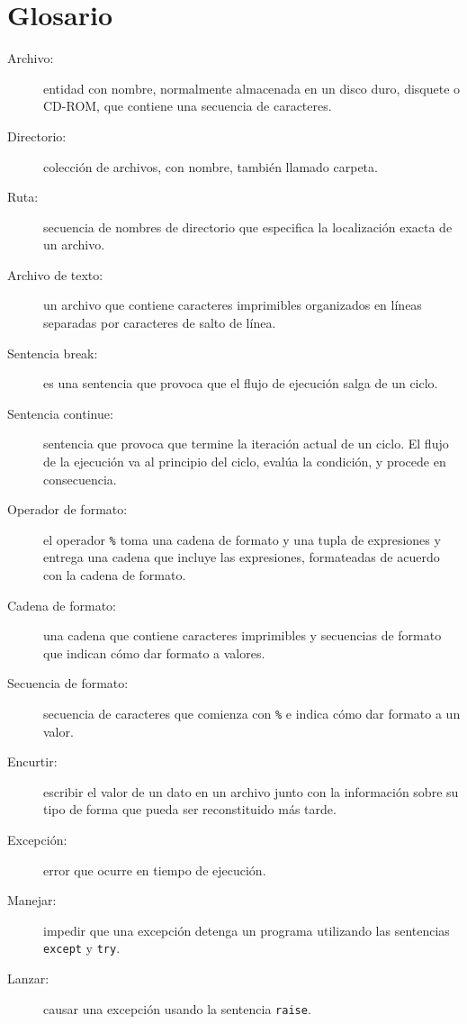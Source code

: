 \section{Glosario}

  
  
  
   
  
\begin{description}
\item [{Archivo:}] entidad con nombre, normalmente almacenada en un disco
duro, disquete o CD-ROM, que contiene una secuencia de caracteres.
\item [{Directorio:}] colección de archivos, con nombre, también llamado
carpeta.
\item [{Ruta:}] secuencia de nombres de directorio que especifica la localización
exacta de un archivo.
\item [{Archivo de texto:}] un archivo que contiene caracteres imprimibles
organizados en líneas separadas por caracteres de salto de línea.
\item [{Sentencia break:}] es una sentencia que provoca que el flujo de
ejecución salga de un ciclo.
\item [{Sentencia continue:}] sentencia que provoca que termine la iteración
actual de un ciclo. El flujo de la ejecución va al principio del ciclo,
evalúa la condición, y procede en consecuencia.
\item [{Operador de formato:}] el operador \texttt{\%} toma una cadena
de formato y una tupla de expresiones y entrega una cadena que incluye
las expresiones, formateadas de acuerdo con la cadena de formato.
\item [{Cadena de formato:}] una cadena que contiene caracteres imprimibles
y secuencias de formato que indican cómo dar formato a valores.
\item [{Secuencia de formato:}] secuencia de caracteres que comienza con
\texttt{\%} e indica cómo dar formato a un valor.
\item [{Encurtir:}] escribir el valor de un dato en un archivo junto con
la información sobre su tipo de forma que pueda ser reconstituido
más tarde.
\item [{Excepción:}] error que ocurre en tiempo de ejecución.
\item [{Manejar:}] impedir que una excepción detenga un programa utilizando
las sentencias \texttt{except} y \texttt{try}.
\item [{Lanzar:}] causar una excepción usando la sentencia \texttt{raise}.
\end{description}

